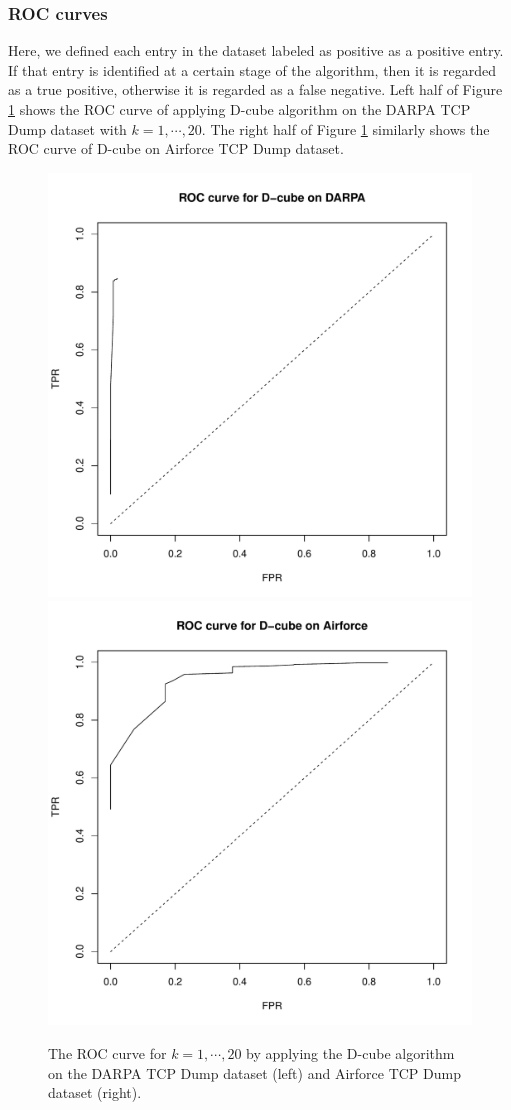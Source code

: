 \subsubsection{ROC curves}

Here, we defined each entry in the dataset labeled as positive as a positive entry. If that entry is identified at a certain stage of the algorithm, then it is regarded as a true positive, otherwise it is regarded as a false negative. Left half of Figure \ref{fig: roc} shows the ROC curve of applying D-cube algorithm on the DARPA TCP Dump dataset with $k = 1, \cdots, 20$. The right half of Figure \ref{fig: roc} similarly shows the ROC curve of D-cube on Airforce TCP Dump dataset. 

\begin{figure}[htbp]
\centering 
\includegraphics[width=.45\columnwidth]{plots/darpa_ROC.pdf} 
\includegraphics[width=.45\columnwidth]{plots/airforce_ROC.pdf} 
\caption{The ROC curve for $k = 1, \cdots, 20$ by applying the D-cube algorithm on the DARPA TCP Dump dataset (left) and Airforce TCP Dump dataset (right). }
\label{fig: roc}
\end{figure}




